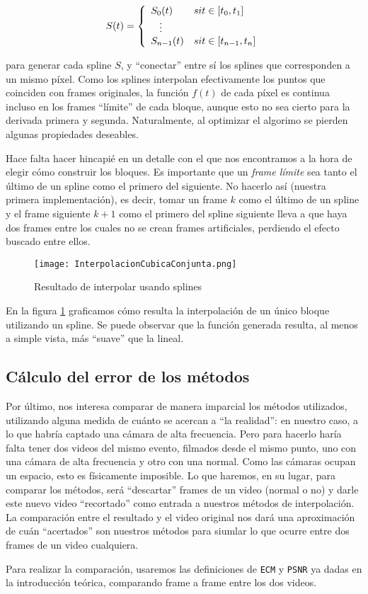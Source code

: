 $$
S(t) = 
\left\{
    \begin{array}{ll}
        S_0(t)  & \mbox{si } t \in [t_{0}, t_1] \\
        \hspace{0.3cm}\vdots \\     
        S_{n - 1}(t) & \mbox{si } t \in [t_{n - 1}, t_n]
    \end{array}
\right.
$$

para generar cada spline $S$, y ``conectar'' entre sí los splines que corresponden a un mismo píxel. Como los splines interpolan efectivamente los puntos que coinciden con frames originales, la función $f(t)$ de cada píxel es continua incluso en los frames ``límite'' de cada bloque, aunque esto no sea cierto para la derivada primera y segunda. Naturalmente, al optimizar el algorimo se pierden algunas propiedades deseables.

Hace falta hacer hincapié en un detalle con el que nos encontramos a la hora de elegir cómo construir los bloques. Es importante que un \emph{frame límite} sea tanto el último de un spline como el primero del siguiente. No hacerlo así (nuestra primera implementación), es decir, tomar un frame $k$ como el último de un spline y el frame siguiente $k+1$ como el primero del spline siguiente lleva a que haya dos frames entre los cuales no se crean frames artificiales, perdiendo el efecto buscado entre ellos.

\begin{figure}[h!]
  \centering
    \texttt{[image: InterpolacionCubicaConjunta.png]}
     \caption{Resultado de interpolar usando splines}\label{fig:intConjuntaSplines}
\end{figure}
\noindent

En la figura \ref{fig:intConjuntaSplines} graficamos cómo resulta la interpolación de un único bloque utilizando un spline. Se puede observar que la función generada resulta, al menos a simple vista, más ``suave'' que la lineal.

\subsection{Cálculo del error de los métodos}
Por último, nos interesa comparar de manera imparcial los métodos utilizados, utilizando alguna medida de cuánto se acercan a ``la realidad'': en nuestro caso, a lo que habría captado una cámara de alta frecuencia. Pero para hacerlo haría falta tener dos videos del mismo evento, filmados desde el mismo punto, uno con una cámara de alta frecuencia y otro con una normal. Como las cámaras ocupan un espacio, esto es físicamente imposible\cite{wiki_impenetrability}. Lo que haremos, en su lugar, para comparar los métodos, será ``descartar'' frames de un video (normal o no) y darle este nuevo video ``recortado'' como entrada a nuestros métodos de interpolación. La comparación entre el resultado y el video original nos dará una aproximación de cuán ``acertados'' son nuestros métodos para siumlar lo que ocurre entre dos frames de un video cualquiera.

Para realizar la comparación, usaremos las definiciones de \texttt{ECM} y \texttt{PSNR} ya dadas en la introducción teórica, comparando frame a frame entre los dos videos.